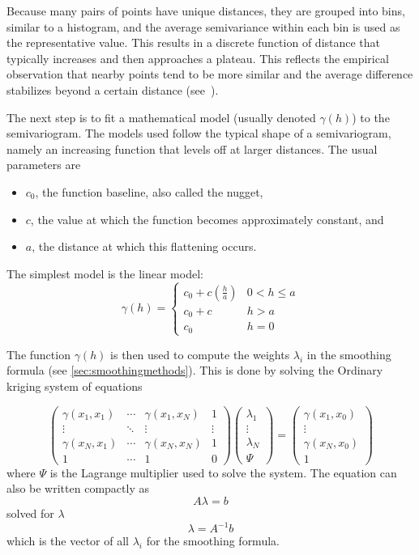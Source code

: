 Because many pairs of points have unique distances, they are grouped into bins, similar to a histogram, and the average semivariance within each bin is used as the representative value. This results in a discrete function of distance that typically increases and then approaches a plateau. This reflects the empirical observation that nearby points tend to be more similar and the average difference stabilizes beyond a certain distance (see\ \cite{kriging:web01}).

The next step is to fit a mathematical model (usually denoted $\gamma(h)$) to the semivariogram. The models used follow the typical shape of a semivariogram, namely an increasing function that levels off at larger distances. The usual parameters are
\begin{itemize}
    \item $c_0$, the function baseline, also called the nugget,
    \item $c$, the value at which the function becomes approximately constant, and
    \item $a$, the distance at which this flattening occurs.
\end{itemize}

The simplest model is the linear model:
\[
\gamma(h)=
\begin{cases}
    c_0+c\left(\frac{h}{a}\right) & 0 < h \le a\\
    c_0+c & h > a\\
    c_0 & h=0
\end{cases}
\]
\begin{minipage}{\textwidth}
    The function $\gamma(h)$ is then used to compute the weights $\lambda_i$ in the smoothing formula (see \autoref{sec:smoothingmethods}). This is done by solving the Ordinary kriging system of equations
\end{minipage}
\[
\left(\begin{matrix}
    \gamma(x_1, x_1) & \dotsi & \gamma(x_1, x_N) & 1\\
    \vdots & \ddots & \vdots & \vdots\\
    \gamma(x_N, x_1) & \dotsi & \gamma(x_N, x_N) & 1\\
    1 & \dotsi & 1 & 0
\end{matrix}\right)
\left(\begin{matrix}
    \lambda_1\\
    \vdots\\
    \lambda_N\\
    \Psi
\end{matrix}\right)
=
\left(
\begin{matrix}
    \gamma(x_1,x_0)\\
    \vdots\\
    \gamma(x_N,x_0)\\
    1
\end{matrix}\right)
\]
where $\Psi$ is the Lagrange multiplier used to solve the system. The equation can also be written compactly as
\[
A\lambda=b
\]
solved for $\lambda$\ \cite{kriging:web02}
\[
\lambda=A^{-1}b
\]
which is the vector of all $\lambda_i$ for the smoothing formula.

